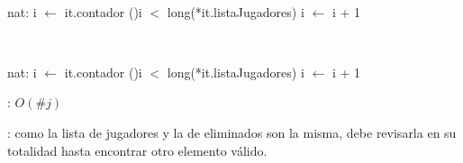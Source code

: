\begin{Algoritmos}
	~

	\begin{algorithm}[H]
		\NoCaptionOfAlgo
		\caption{}
		nat: i $\leftarrow$ it.contador
		\While(){i $<$ long(*it.listaJugadores)}{
			i $\leftarrow$ i + 1
		}
	\end{algorithm}

	~

	\begin{algorithm}[H]
		\NoCaptionOfAlgo
		\caption{}
		nat: i $\leftarrow$ it.contador
		\While(){i $<$ long(*it.listaJugadores)}{
			i $\leftarrow$ i + 1
		}
	\end{algorithm}

	\complejidad: $O(\#j)$

	\justifcomp: como la lista de jugadores y la de eliminados son la misma, debe revisarla en su totalidad hasta encontrar otro elemento válido.

	~


\end{Algoritmos}
